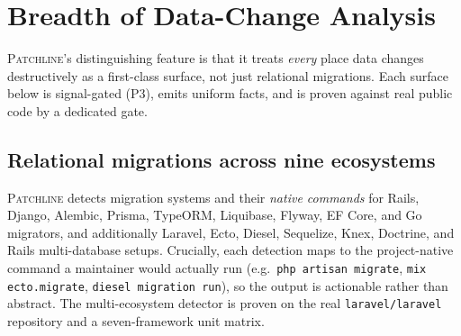\documentclass[11pt]{article}
\newcommand{\tool}{\textsc{Patchline}}
\newcommand{\code}[1]{\texttt{#1}}
\begin{document}
\section{Breadth of Data-Change Analysis}
\label{sec:breadth}

\tool's distinguishing feature is that it treats \emph{every} place data changes destructively as a
first-class surface, not just relational migrations. Each surface below is signal-gated (P3), emits
uniform facts, and is proven against real public code by a dedicated gate.

\subsection{Relational migrations across nine ecosystems}
\tool{} detects migration systems and their \emph{native commands} for Rails, Django, Alembic,
Prisma, TypeORM, Liquibase, Flyway, EF Core, and Go migrators, and additionally Laravel, Ecto,
Diesel, Sequelize, Knex, Doctrine, and Rails multi-database setups. Crucially, each detection maps to
the project-native command a maintainer would actually run (e.g.\ \code{php artisan migrate},
\code{mix ecto.migrate}, \code{diesel migration run}), so the output is actionable rather than
abstract. The multi-ecosystem detector is proven on the real \code{laravel/laravel} repository and a
seven-framework unit matrix.
\end{document}
